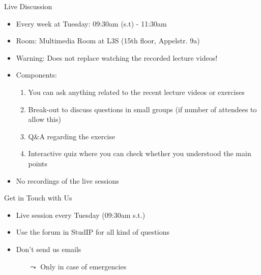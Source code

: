 \documentclass[aspectratio=169]{../latex_main/tntbeamer}  %
\begin{document}
\begin{frame}[c]{Live Discussion}

\begin{itemize}
  \item Every week at Tuesday: 09:30am (s.t) - 11:30am\\ 
  \item Room: Multimedia Room at L3S (15th floor, Appelstr. 9a)
  \pause
  \item Warning: Does not replace watching the recorded lecture videos!
  \pause
  \smallskip
  \item Components:
  \begin{enumerate}
       \item You can ask anything related to the recent lecture videos or exercises
      \item Break-out to discuss questions in small groups (if number of attendees to allow this)
      \pause
      \item Q\&A regarding the exercise
      \pause
      \item Interactive quiz where you can check whether you understood the main points
  \end{enumerate}
  \pause
  \medskip
  \item No recordings of the live sessions
\end{itemize}

\end{frame}
\begin{frame}[c]{Get in Touch with Us}

\begin{itemize}
  \item Live session every Tuesday (09:30am s.t.)
  \item \alert{Use the forum in StudIP for all kind of questions}
  \item Don't send us emails
  \begin{itemize}
      \item[$\leadsto$] Only in case of emergencies
  \end{itemize}
\end{itemize}

\end{frame}
\end{document}
